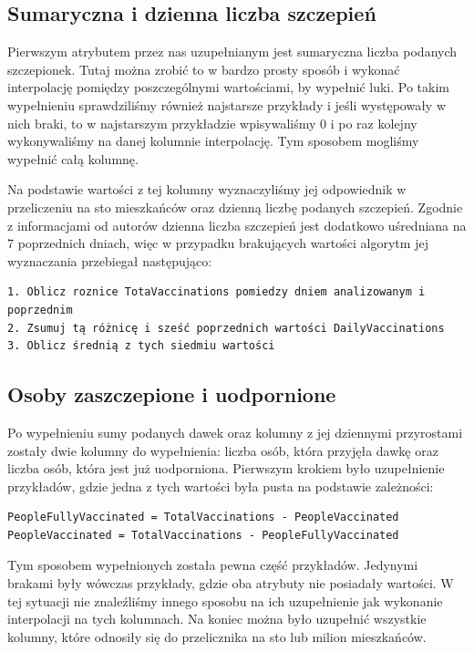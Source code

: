 \documentclass[12pt, oneside]{article}
\begin{document}
\subsection{Sumaryczna i dzienna liczba szczepień}

Pierwszym atrybutem przez nas uzupełnianym jest sumaryczna liczba podanych szczepionek. Tutaj można zrobić to w bardzo prosty sposób i wykonać interpolację pomiędzy poszczególnymi wartościami, by wypełnić luki. Po takim wypełnieniu sprawdziliśmy również najstarsze przykłady i jeśli występowały w nich braki, to w najstarszym przykładzie wpisywaliśmy 0 i po raz kolejny wykonywaliśmy na danej kolumnie interpolację. Tym sposobem mogliśmy wypełnić całą kolumnę. 

Na podstawie wartości z tej kolumny wyznaczyliśmy jej odpowiednik w przeliczeniu na sto mieszkańców oraz dzienną liczbę podanych szczepień. Zgodnie z informacjami od autorów dzienna liczba szczepień jest dodatkowo uśredniana na 7 poprzednich dniach, więc w przypadku brakujących wartości algorytm jej wyznaczania przebiegał następująco:
\begin{Verbatim}[tabsize=4]
1. Oblicz roznice TotaVaccinations pomiedzy dniem analizowanym i poprzednim
2. Zsumuj tą różnicę i sześć poprzednich wartości DailyVaccinations
3. Oblicz średnią z tych siedmiu wartości
\end{Verbatim}

\subsection{Osoby zaszczepione i uodpornione}

Po wypełnieniu sumy podanych dawek oraz kolumny z jej dziennymi przyrostami zostały dwie kolumny do wypełnienia: liczba osób, która przyjęła dawkę oraz liczba osób, która jest już uodporniona. Pierwszym krokiem było uzupełnienie przykładów, gdzie jedna z tych wartości była pusta na podstawie zależności:
\begin{Verbatim}[tabsize=4]
PeopleFullyVaccinated = TotalVaccinations - PeopleVaccinated
PeopleVaccinated = TotalVaccinations - PeopleFullyVaccinated
\end{Verbatim}

Tym sposobem wypełnionych została pewna część przykładów. Jedynymi brakami były wówczas przykłady, gdzie oba atrybuty nie posiadały wartości. W tej sytuacji nie znaleźliśmy innego sposobu na ich uzupełnienie jak wykonanie interpolacji na tych kolumnach. Na koniec można było uzupełnić wszystkie kolumny, które odnosiły się do przelicznika na sto lub milion mieszkańców.
\end{document}
